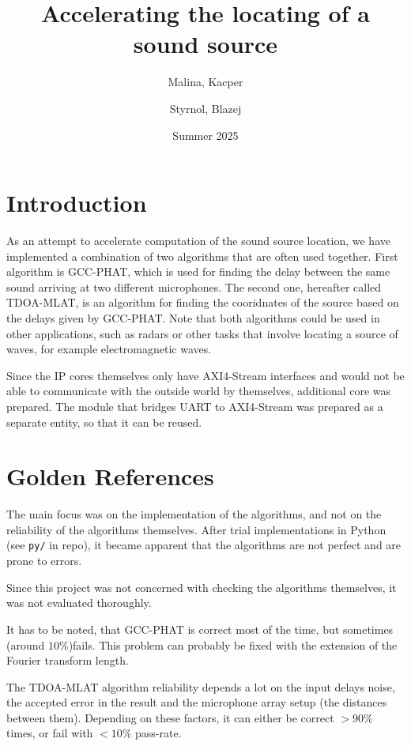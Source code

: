 \documentclass[a4paper,twocolumn]{article}
\title{Accelerating the locating of a sound source}
\date{Summer 2025}
\author{
  Malina, Kacper
  \and
  Styrnol, Blazej
}
\begin{document}
\maketitle

\section{Introduction}

As an attempt to accelerate computation of the sound source location,
we have implemented a combination of two algorithms that are often
used together. First algorithm is
GCC-PHAT, which is used for finding the delay between the same sound
arriving at two different microphones. The second one, hereafter
called TDOA-MLAT, is an algorithm for finding the cooridnates of the
source based on the delays given by GCC-PHAT. Note that both
algorithms could be used in other applications, such as radars or
other tasks that involve locating a source of waves, for example
electromagnetic waves.

Since the IP cores themselves only have AXI4-Stream interfaces and
would not be able to communicate with the outside world by themselves,
additional core was prepared. The module that bridges UART to
AXI4-Stream was prepared as a separate entity, so that it can be
reused.

\section{Golden References}

The main focus was on the implementation of the algorithms, and not on
the reliability of the algorithms themselves. After trial
implementations in Python (see \texttt{py/} in repo), it became
apparent that the algorithms are not perfect and are prone to errors.

Since this project was not concerned with checking the algorithms
themselves, it was not evaluated thoroughly.

It has to be noted, that GCC-PHAT is correct most of the time, but
sometimes (around $10\%$)fails. This problem can probably be fixed
with the extension of the Fourier transform length.

The TDOA-MLAT algorithm reliability depends a lot on the input delays
noise, the accepted error in the result and the microphone array setup
(the distances between them). Depending on these factors, it can
either be correct $>90\%$ times, or fail with $<10\%$ pass-rate.
\end{document}
